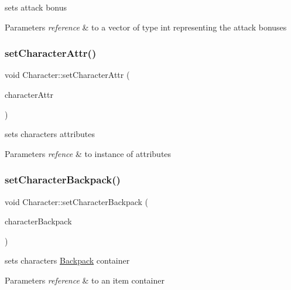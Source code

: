 sets attack bonus 
\begin{DoxyParams}{Parameters}
{\em reference} & to a vector of type int representing the attack bonuses \\
\hline
\end{DoxyParams}
\hypertarget{class_character_adeafa649ad931a4f84516de0b3017f45}{}\label{class_character_adeafa649ad931a4f84516de0b3017f45} 
\subsubsection{\texorpdfstring{set\+Character\+Attr()}{setCharacterAttr()}}
{\footnotesize\ttfamily void Character\+::set\+Character\+Attr (\begin{DoxyParamCaption}\item[{\hyperlink{class_character_attr}{Character\+Attr} $\ast$}]{character\+Attr }\end{DoxyParamCaption})}

sets characters attributes 
\begin{DoxyParams}{Parameters}
{\em refence} & to instance of attributes \\
\hline
\end{DoxyParams}
\hypertarget{class_character_aee2b7dc1104b26053abae5ca8606d9ed}{}\label{class_character_aee2b7dc1104b26053abae5ca8606d9ed} 
\subsubsection{\texorpdfstring{set\+Character\+Backpack()}{setCharacterBackpack()}}
{\footnotesize\ttfamily void Character\+::set\+Character\+Backpack (\begin{DoxyParamCaption}\item[{\hyperlink{class_item_container}{Item\+Container} $\ast$}]{character\+Backpack }\end{DoxyParamCaption})}

sets characters \hyperlink{class_backpack}{Backpack} container 
\begin{DoxyParams}{Parameters}
{\em reference} & to an item container \\
\hline
\end{DoxyParams}
\hypertarget{class_character_aa36f485d4d779b33cb3da8997c3072c5}{}\label{class_character_aa36f485d4d779b33cb3da8997c3072c5} 
